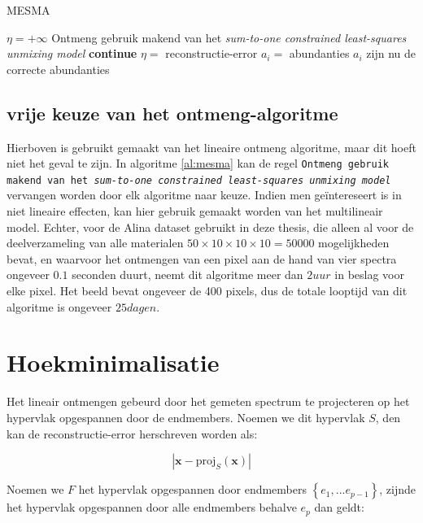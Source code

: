 \documentclass[12pt]{report}
\newcommand{\proj}[2]{\text{proj}_{#2}\left(#1\right)}
\begin{document}
\begin{algorithm}
\caption{MESMA\label{al:mesma}}
\begin{algorithmic}[1]
\State $\eta = +\infty$ 
\State Ontmeng gebruik makend van het \textit{sum-to-one constrained least-squares unmixing model}
\State \textbf{continue}
\EndIf
{}
\State $\eta = $ reconstructie-error
\State $a_i = $ abundanties
\EndIf
\EndFor
\EndFor
\State $a_i$ zijn nu de correcte abundanties
\end{algorithmic}
\end{algorithm}

\subsection{vrije keuze van het ontmeng-algoritme}
Hierboven is gebruikt gemaakt van het lineaire ontmeng algoritme, maar dit hoeft niet het geval te zijn. In algoritme \ref{al:mesma} kan de regel \texttt{Ontmeng gebruik makend van het \textit{sum-to-one constrained least-squares unmixing model}} vervangen worden door elk algoritme naar keuze. Indien men ge\"intereseert is in niet lineaire effecten, kan hier gebruik gemaakt worden van het multilineair model. Echter, voor de Alina dataset gebruikt in deze thesis, die alleen al voor de deelverzameling van alle materialen $50\times 10\times 10 \times 10= 50000$ mogelijkheden bevat, en waarvoor het ontmengen van een pixel aan de hand van vier spectra ongeveer $0.1$ seconden duurt, neemt dit algoritme meer dan $2 uur$ in beslag voor elke pixel. Het beeld bevat ongeveer de 400 pixels, dus de totale looptijd van dit algoritme is ongeveer $25 dagen$. 

\section{Hoekminimalisatie}

Het lineair ontmengen gebeurd door het gemeten spectrum te projecteren op het hypervlak opgespannen door de endmembers. Noemen we dit hypervlak $S$, den kan de reconstructie-error herschreven worden als:

\begin{equation}
\left| \bm{x} - \proj{\bm{x}}{S}\right|
\end{equation}

Noemen we $F$ het hypervlak opgespannen door endmembers $\left\{ e_1 , ... e_{p-1} \right\}$, zijnde het hypervlak opgespannen door alle endmembers behalve $e_p$ dan geldt:
\end{document}
